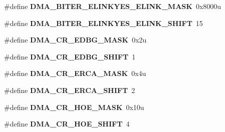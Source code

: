 \begin{DoxyCompactItemize}
\item 
\#define {\bfseries D\+M\+A\+\_\+\+B\+I\+T\+E\+R\+\_\+\+E\+L\+I\+N\+K\+Y\+E\+S\+\_\+\+E\+L\+I\+N\+K\+\_\+\+M\+A\+SK}~0x8000u\hypertarget{group__DMA__Register__Masks_ga778135a3df3e1f1696c74d53062dbe27}{}\label{group__DMA__Register__Masks_ga778135a3df3e1f1696c74d53062dbe27}

\item 
\#define {\bfseries D\+M\+A\+\_\+\+B\+I\+T\+E\+R\+\_\+\+E\+L\+I\+N\+K\+Y\+E\+S\+\_\+\+E\+L\+I\+N\+K\+\_\+\+S\+H\+I\+FT}~15\hypertarget{group__DMA__Register__Masks_ga140716200d5f09b3f8819f8794444008}{}\label{group__DMA__Register__Masks_ga140716200d5f09b3f8819f8794444008}

\item 
\#define {\bfseries D\+M\+A\+\_\+\+C\+R\+\_\+\+E\+D\+B\+G\+\_\+\+M\+A\+SK}~0x2u\hypertarget{group__DMA__Register__Masks_gaa2605f7da2bd6fae13e3e38830bafb1d}{}\label{group__DMA__Register__Masks_gaa2605f7da2bd6fae13e3e38830bafb1d}

\item 
\#define {\bfseries D\+M\+A\+\_\+\+C\+R\+\_\+\+E\+D\+B\+G\+\_\+\+S\+H\+I\+FT}~1\hypertarget{group__DMA__Register__Masks_ga8a25fbfa3435be2df140701c300f6cc5}{}\label{group__DMA__Register__Masks_ga8a25fbfa3435be2df140701c300f6cc5}

\item 
\#define {\bfseries D\+M\+A\+\_\+\+C\+R\+\_\+\+E\+R\+C\+A\+\_\+\+M\+A\+SK}~0x4u\hypertarget{group__DMA__Register__Masks_ga52ad0bfd27aa8dbb1e157eb2c8099c53}{}\label{group__DMA__Register__Masks_ga52ad0bfd27aa8dbb1e157eb2c8099c53}

\item 
\#define {\bfseries D\+M\+A\+\_\+\+C\+R\+\_\+\+E\+R\+C\+A\+\_\+\+S\+H\+I\+FT}~2\hypertarget{group__DMA__Register__Masks_gab3e613091d693c1c110bfbb902d58392}{}\label{group__DMA__Register__Masks_gab3e613091d693c1c110bfbb902d58392}

\item 
\#define {\bfseries D\+M\+A\+\_\+\+C\+R\+\_\+\+H\+O\+E\+\_\+\+M\+A\+SK}~0x10u\hypertarget{group__DMA__Register__Masks_ga6324cec54d0032bcc142e28f4e1b5978}{}\label{group__DMA__Register__Masks_ga6324cec54d0032bcc142e28f4e1b5978}

\item 
\#define {\bfseries D\+M\+A\+\_\+\+C\+R\+\_\+\+H\+O\+E\+\_\+\+S\+H\+I\+FT}~4\hypertarget{group__DMA__Register__Masks_gaddcd684abfce8db15928255dc243dbcb}{}\label{group__DMA__Register__Masks_gaddcd684abfce8db15928255dc243dbcb}


\end{DoxyCompactItemize}
